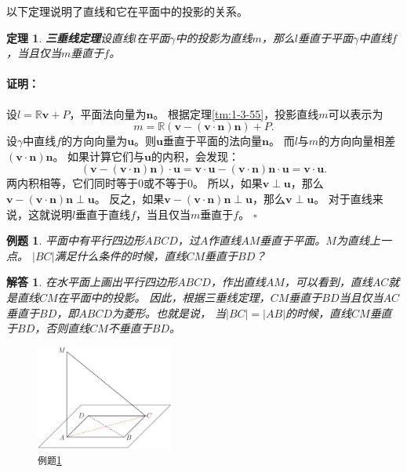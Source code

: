 \documentclass[12pt,UTF8]{ctexbook}
\newtheorem{tm}{定理}[section]
\newtheorem{et}{例题}[section]
\renewenvironment{proof}{\paragraph{\textbf{证明：}}}{\hfill$\square$}
\newtheorem*{so}{解答}
\begin{document}
以下定理说明了直线和它在平面中的投影的关系。
\begin{tm}{\textbf{三垂线定理}}\label{tm:1-3-57}
    设直线$l$在平面$\gamma$中的投影为直线$m$，那么$l$垂直于平面$\gamma$中直线$f$，当且仅当$m$垂直于$f$。
\end{tm}
\begin{proof}
    设$l=\mathbb{R}\mathbf{v}+P$，平面法向量为$\mathbf{n}$。
    根据定理\ref{tm:1-3-55}，投影直线$m$可以表示为
    $$m = \mathbb{R}(\mathbf{v} - (\mathbf{v}\cdot\mathbf{n})\mathbf{n}) + P.$$
    设$\gamma$中直线$f$的方向向量为$\mathbf{u}$。则$\mathbf{u}$垂直于平面的法向量$\mathbf{n}$。
    而$l$与$m$的方向向量相差$(\mathbf{v}\cdot\mathbf{n})\mathbf{n}$。
    如果计算它们与$\mathbf{u}$的内积，会发现：
    $$ (\mathbf{v} - (\mathbf{v}\cdot\mathbf{n})\mathbf{n})\cdot \mathbf{u} = \mathbf{v} \cdot \mathbf{u} - (\mathbf{v}\cdot\mathbf{n})\mathbf{n} \cdot \mathbf{u} = \mathbf{v} \cdot \mathbf{u}. $$
    两内积相等，它们同时等于$0$或不等于$0$。
    所以，如果$\mathbf{v} \perp \mathbf{u}$，那么$\mathbf{v} - (\mathbf{v}\cdot\mathbf{n})\mathbf{n} \perp \mathbf{u}$。
    反之，如果$\mathbf{v} - (\mathbf{v}\cdot\mathbf{n})\mathbf{n} \perp \mathbf{u}$，那么$\mathbf{v} \perp \mathbf{u}$。
    对于直线来说，这就说明$l$垂直于直线$f$，当且仅当$m$垂直于$f$。
\end{proof}

\begin{et}\label{et:1-3-10}
    平面中有平行四边形$ABCD$，过$A$作直线$AM$垂直于平面。$M$为直线上一点。
    $|BC|$满足什么条件的时候，直线$CM$垂直于$BD$？
\end{et}
\begin{so}
    在水平面上画出平行四边形$ABCD$，作出直线$AM$，可以看到，直线$AC$就是直线$CM$在平面中的投影。
    因此，根据三垂线定理，$CM$垂直于$BD$当且仅当$AC$垂直于$BD$，即$ABCD$为菱形。也就是说，
    当$|BC|=|AB|$的时候，直线$CM$垂直于$BD$，否则直线$CM$不垂直于$BD$。
\end{so}

\begin{figure} %
    \vspace{-45pt}
    \flushright
    \includegraphics[width=0.4\textwidth]{tu/垂线例10.png}
    \caption*{\texttt{例题}\ref{et:1-3-10}}
\end{figure}
\end{document}
